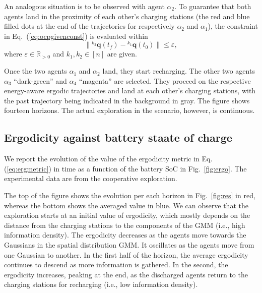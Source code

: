 \documentclass[letterpaper,10pt,conference,twoside]{IEEEtran}
\theoremstyle{definition}
\begin{document}
An analogous situation is to be observed with agent $\alpha_2$. %
To guarantee that both agents land in the proximity of each other's charging stations (the red and blue filled dots at the end of the trajectories for respectively $\alpha_2$ and $\alpha_1$), %
the constraint in Eq.~(\ref{eq:ocpgivenconst}) is evaluated within
\begin{equation}\label{eq:resaddconst}
  \lVert{}^{k_2}\mathbf{q}(t_f)-{}^{k_1}\mathbf{q}(t_0)\rVert\leq\varepsilon,
\end{equation} 
where $\varepsilon\in\mathbb{R}_{>0}$ and $k_1,k_2\in[n]$ are given.

Once the two agents $\alpha_1$ and $\alpha_2$ land, they start recharging. %
The other two agents $\alpha_3$ ``dark-green'' and $\alpha_4$ ``magenta'' are selected. %
They proceed on the respective energy-aware ergodic trajectories and land at each other's charging stations, with the past trajectory being indicated in the background in gray. The figure shows fourteen horizons. The actual exploration in the scenario, however, is continuous. 

\subsection*{Ergodicity against battery staate of charge}
\noindent
We report the evolution of the value of the ergodicity metric in Eq. (\ref{eq:ergmetric}) in time as a function of the battery SoC in Fig.~\ref{fig:ergo}. The experimental data are from the cooperative exploration.%

The top of the figure shows the evolution per each horizon in Fig.~\ref{fig:res} in red, whereas the bottom shows the averaged value in blue. We can observe that the exploration starts at an initial value of ergodicity, which mostly depends on the distance from the charging stations to the components of the GMM (i.e., high information density). The ergodicity decreases as the agents move towards the Gaussians in the spatial distribution GMM. It oscillates as the agents move from one Gaussian to another. In the first half of the horizon, the average ergodicity continues to descend as more information is gathered. In the second, the ergodicity increases, peaking at the end, as the discharged agents return to the charging stations for recharging (i.e., low information density).
\end{document}

